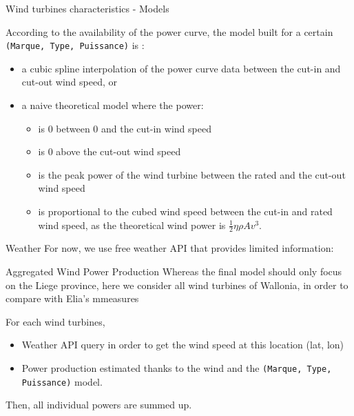 \documentclass[12pt]{beamer}
\begin{document}
\begin{frame}{Wind turbines characteristics - Models}

According to the availability of the power curve, the model built for a certain \texttt{(Marque, Type, Puissance)} is : 
\begin{itemize}
    \item {a \alert{cubic spline interpolation of the power curve data}} between the cut-in and cut-out wind speed, or
    \item a \alert{naive theoretical model} where the power:
    \begin{itemize}
        \item is 0 between 0 and the cut-in wind speed
        \item is 0 above the cut-out wind speed
        \item is the peak power of the wind turbine between the rated and the cut-out wind speed
        \item is proportional to the cubed wind speed between the cut-in and rated wind speed, as the theoretical wind power is $\frac{1}{2} \eta \rho A v^3$.
    \end{itemize}
\end{itemize}
    
\end{frame}

\begin{frame}{Weather}
    For now, we use free weather API that provides limited information:
    
    
\end{frame}

\begin{frame}{Aggregated Wind Power Production}
    Whereas the final model should only focus on the Liege province, here we consider all wind turbines of Wallonia, in order to compare with \alert{Elia's mmeasures}
    
    For \alert{each wind turbines}, 
    \begin{itemize}
        \item Weather API query in order to get the \alert{wind speed} at this location (lat, lon)
        \item Power production estimated thanks to the wind and the \texttt{(Marque, Type, Puissance)} \alert{model}.
    \end{itemize}
    
    Then, all individual powers are summed up.
\end{frame}
\end{document}
